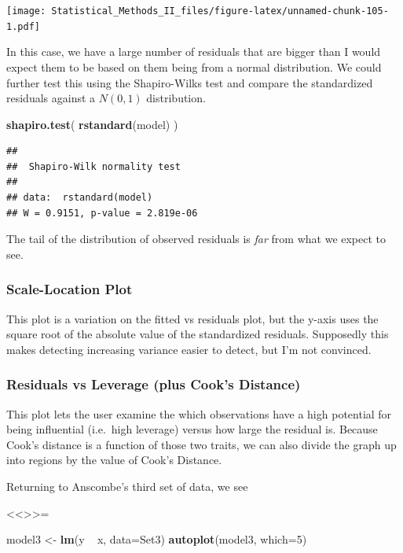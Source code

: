 \documentclass[]{book}
\newenvironment{Shaded}{\begin{snugshade}}{\end{snugshade}}
\newcommand{\KeywordTok}[1]{\textcolor[rgb]{0.13,0.29,0.53}{\textbf{{#1}}}}
\newcommand{\DataTypeTok}[1]{\textcolor[rgb]{0.13,0.29,0.53}{{#1}}}
\newcommand{\DecValTok}[1]{\textcolor[rgb]{0.00,0.00,0.81}{{#1}}}
\newcommand{\StringTok}[1]{\textcolor[rgb]{0.31,0.60,0.02}{{#1}}}
\newcommand{\NormalTok}[1]{{#1}}
\theoremstyle{definition}
\theoremstyle{definition}
\theoremstyle{remark}
\begin{document}
\texttt{[image: Statistical\_Methods\_II\_files/figure-latex/unnamed-chunk-105-1.pdf]}

In this case, we have a large number of residuals that are bigger than I
would expect them to be based on them being from a normal distribution.
We could further test this using the Shapiro-Wilks test and compare the
standardized residuals against a \(N\left(0,1\right)\) distribution.

\begin{Shaded}
\begin{Highlighting}[]
\KeywordTok{shapiro.test}\NormalTok{( }\KeywordTok{rstandard}\NormalTok{(model) )}
\end{Highlighting}
\end{Shaded}

\begin{verbatim}
## 
##  Shapiro-Wilk normality test
## 
## data:  rstandard(model)
## W = 0.9151, p-value = 2.819e-06
\end{verbatim}

The tail of the distribution of observed residuals is \emph{far} from
what we expect to see.

\subsubsection{Scale-Location Plot}\label{scale-location-plot}

This plot is a variation on the fitted vs residuals plot, but the y-axis
uses the square root of the absolute value of the standardized
residuals. Supposedly this makes detecting increasing variance easier to
detect, but I'm not convinced.

\subsubsection{Residuals vs Leverage (plus Cook's
Distance)}\label{residuals-vs-leverage-plus-cooks-distance}

This plot lets the user examine the which observations have a high
potential for being influential (i.e.~high leverage) versus how large
the residual is. Because Cook's distance is a function of those two
traits, we can also divide the graph up into regions by the value of
Cook's Distance.

Returning to Anscombe's third set of data, we see

\textless{}\textless{}\textgreater{}\textgreater{}=

\begin{Shaded}
\begin{Highlighting}[]
\NormalTok{model3 <-}\StringTok{ }\KeywordTok{lm}\NormalTok{(y ~}\StringTok{ }\NormalTok{x, }\DataTypeTok{data=}\NormalTok{Set3)}
\KeywordTok{autoplot}\NormalTok{(model3, }\DataTypeTok{which=}\DecValTok{5}\NormalTok{)}
\end{Highlighting}
\end{Shaded}
\end{document}
